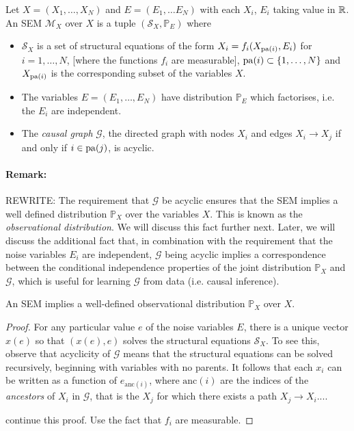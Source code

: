 \begin{definition}
Let $X = (X_1, \ldots, X_N)$ and $E = (E_1, \ldots E_N)$ with each $X_i$, $E_i$ taking value in $\mathbb{R}$. An SEM $\mathcal{M}_X$ over $X$ is a tuple $(\mathcal{S}_X, \mathbb{P}_E)$ where
\begin{itemize}
	\item $\mathcal{S}_X$ is a set of structural equations of the form $X_i = f_i(X_{\operatorname{pa}(i)}, E_i)$ for $i=1,\ldots,N$, [where the functions $f_i$ are measurable], $\operatorname{pa}(i) \subset \{1,\ldots,N\}$ and $X_{\operatorname{pa}(i)}$ is the corresponding subset of the variables $X$.
	\item The variables $E = (E_1,\ldots,E_N)$ have distribution $\mathbb{P}_E$ which factorises, i.e. the $E_i$ are independent.
	\item The \emph{causal graph} $\mathcal{G}$, the directed graph with nodes $X_i$ and edges $X_i \to X_j$ if and only if $i \in \operatorname{pa}(j)$, is acyclic.
\end{itemize}
\end{definition}

\paragraph{Remark:} REWRITE:
The requirement that $\mathcal{G}$ be acyclic ensures that the SEM implies a well defined distribution $\mathbb{P}_X$ over the variables $X$. This is known as the \emph{observational distribution}. We will discuss this fact further next. Later, we will discuss the additional fact that, in combination with the requirement that the noise variables $E_i$ are independent, $\mathcal{G}$ being acyclic implies a correspondence between the conditional independence properties of the joint distribution $\mathbb{P}_X$ and $\mathcal{G}$, which is useful for learning $\mathcal{G}$ from data (i.e. causal inference). 

\begin{lemma}\label{lemma:acyclic-sem-well-defined-obs-dist}
An SEM implies a well-defined observational distribution $\mathbb{P}_X$ over $X$.
\end{lemma}
\begin{proof}
For any particular value $e$ of the noise variables $E$, there is a unique vector $x(e)$ so that $(x(e), e)$ solves the structural equations $\mathcal{S}_X$. To see this, observe that acyclicity of $\mathcal{G}$ means that the structural equations can be solved recursively, beginning with variables with no parents. It follows that each $x_i$ can be written as a function of $e_{\text{anc}(i)}$, where $\text{anc}(i)$ are the indices of the \emph{ancestors} of $X_i$ in $\mathcal{G}$, that is the $X_j$ for which there exists a path $X_j \to X_i$....

continue this proof. Use the fact that $f_i$ are measurable.
\end{proof}

